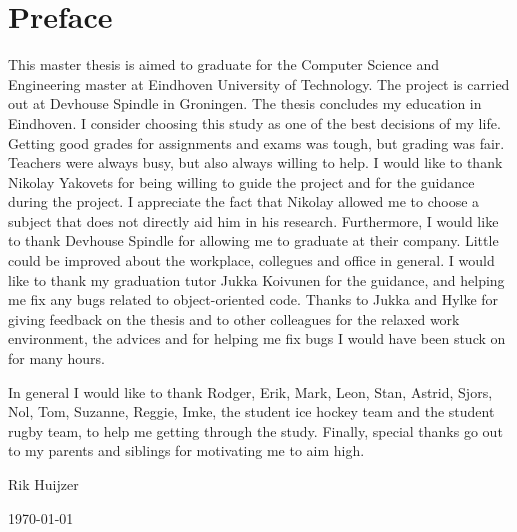 \chapter*{Preface}
\label{ch:preface}

This master thesis is aimed to graduate for the Computer Science and Engineering master at Eindhoven University of Technology.
The project is carried out at Devhouse Spindle in Groningen.
The thesis concludes my education in Eindhoven.
I consider choosing this study as one of the best decisions of my life.
Getting good grades for assignments and exams was tough, but grading was fair.
Teachers were always busy, but also always willing to help.
I would like to thank Nikolay Yakovets for being willing to guide the project and for the guidance during the project.
I appreciate the fact that Nikolay allowed me to choose a subject that does not directly aid him in his research.
Furthermore, I would like to thank Devhouse Spindle for allowing me to graduate at their company.
Little could be improved about the workplace, collegues and office in general.
I would like to thank my graduation tutor Jukka Koivunen for the guidance, and helping me fix any bugs related to object-oriented code.
Thanks to Jukka and Hylke for giving feedback on the thesis and to other colleagues for the relaxed work environment, the advices and for helping me fix bugs I would have been stuck on for many hours.

In general I would like to thank Rodger, Erik, Mark, Leon, Stan, Astrid, Sjors, Nol, Tom, Suzanne, Reggie, Imke, the student ice hockey team and the student rugby team, to help me getting through the study.
Finally, special thanks go out to my parents and siblings for motivating me to aim high.


\vspace*{5mm}
Rik Huijzer

\today